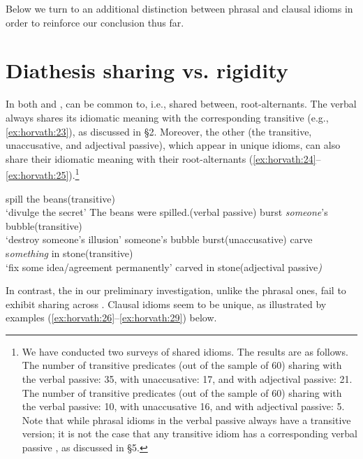 \documentclass[output=paper,
modfonts
]{LSP/langsci}
\begin{document}
Below we turn to an additional distinction between phrasal and clausal
idioms in order to reinforce our conclusion thus far.

\section{Diathesis sharing vs. rigidity}\label{sec:horvath:4}

In both  and ,  can be common to, i.e.,
shared between, root-alternants. The verbal  always shares its
idiomatic meaning with the corresponding transitive (e.g., \ref{ex:horvath:23}), as
discussed in \S2. Moreover, the other  (the transitive,
unaccusative, and adjectival passive), which appear in unique idioms,
can also share their idiomatic meaning with their root-alternants
(\ref{ex:horvath:24}--\ref{ex:horvath:25}).\footnote{We have conducted two surveys of shared idioms. The
  results are as follows. The number of  transitive predicates
  (out of the sample of 60) sharing  with the verbal
  passive: 35, with unaccusative: 17, and with adjectival passive: 21.
  The number of  transitive predicates (out of the sample of 60)
  sharing  with the verbal passive: 10, with unaccusative
  16, and with adjectival passive: 5. Note that while phrasal idioms in the
  verbal passive always have a transitive version; it is not the case
  that any transitive idiom has a corresponding verbal passive ,
  as discussed in \S5.}

\ea \label{ex:horvath:23}
	\ea \label{ex:horvath:23a} spill the beans\hfill (transitive)\\
	`divulge the secret'
	\ex \label{ex:horvath:23b} The beans were spilled.\hfill (verbal passive)
	\z
\ex \label{ex:horvath:24}
	\ea \label{ex:horvath:24a} burst \emph{someone}'s bubble\hfill (transitive)\\
	 `destroy someone's illusion'
	 \ex \label{ex:horvath:24b} someone's bubble burst\hfill (unaccusative)
	 \z
\ex \label{ex:horvath:25}
	\ea \label{ex:horvath:25a} carve s\emph{omething} in stone\hfill (transitive)\\
	 `fix some idea/agreement permanently'
	\ex \label{ex:horvath:25b} carved in stone\hfill  (adjectival passive\emph{)}
	\z
\z

In contrast, the  in our preliminary investigation, unlike
the phrasal ones, fail to exhibit sharing across . Clausal
idioms seem to be unique, as illustrated by examples (\ref{ex:horvath:26}--\ref{ex:horvath:29}) below.
\\
\end{document}
